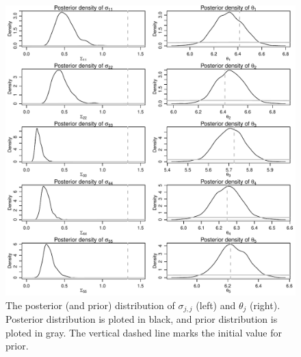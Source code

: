 \documentclass[12pt]{article}
\begin{document}
\begin{figure}[h!]
	\centering
	\includegraphics[width=.9\textwidth]{pic/0.30/Posterior_vs_Prior.pdf}
	\caption{The posterior (and prior) distribution of $\sigma_{j, j}$ (left) and $\theta_j$ (right). Posterior distribution is ploted in black, and prior distribution is ploted in gray. The vertical dashed line marks the initial value for prior.}
	\label{fig:0.30-Posterior_vs_Prior}
\end{figure}
\end{document}
